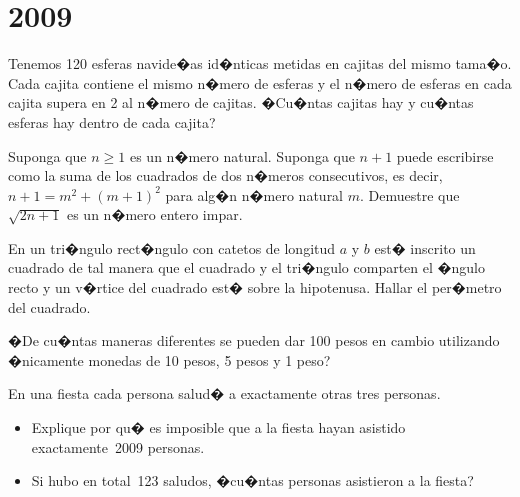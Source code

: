 \chapter{2009}
\label{cha:2009}

\begin{Problema}{1}
  Tenemos 120 esferas navide�as id�nticas metidas en cajitas del mismo
  tama�o.  Cada cajita contiene el mismo n�mero de esferas y el n�mero
  de esferas en cada cajita supera en 2 al n�mero de cajitas. �Cu�ntas
  cajitas hay y cu�ntas esferas hay dentro de cada cajita?
\end{Problema}

\begin{Solucion}
  
\end{Solucion}

\begin{Problema}{2}
  Suponga que $n\geq 1$ es un n�mero natural. Suponga que $n+1$ puede
  escribirse como la suma de los cuadrados de dos n�meros
  consecutivos, es decir, $n+1=m^2+(m+1)^2$ para alg�n n�mero natural
  $m$. Demuestre que $\sqrt{2n+1}$ es un n�mero entero impar.
\end{Problema}

\begin{Solucion}
  
\end{Solucion}

\begin{Problema}{3}
  En un tri�ngulo rect�ngulo con catetos de longitud $a$ y $b$ est�
  inscrito un cuadrado de tal manera que el cuadrado y el tri�ngulo
  comparten el �ngulo recto y un v�rtice del cuadrado est� sobre la
  hipotenusa. Hallar el per�metro del cuadrado.
\end{Problema}

\begin{Solucion}
  
\end{Solucion}

\begin{Problema}{4}
  �De cu�ntas maneras diferentes se pueden dar 100 pesos en cambio
  utilizando �nicamente monedas de 10 pesos, 5 pesos y 1 peso?
\end{Problema}

\begin{Solucion}
  
\end{Solucion}

\begin{Problema}{5}
  En una fiesta cada persona salud� a exactamente otras tres
  personas.
  \begin{itemize}
  \item Explique por qu� es imposible que a la fiesta hayan asistido
    exactamente~2009 personas.
  \item Si hubo en total~123 saludos, �cu�ntas personas asistieron a
    la fiesta?
  \end{itemize}
\end{Problema}

